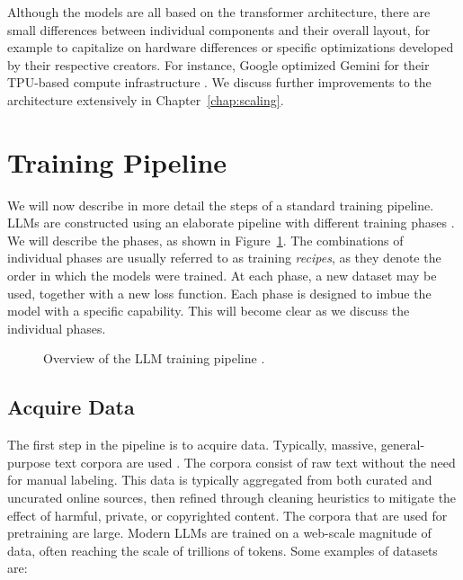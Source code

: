 Although the models are all based on the transformer architecture, there are small differences between individual components and  their overall layout, for example to capitalize on hardware differences or specific optimizations developed by their respective creators. For instance, Google optimized Gemini for their TPU-based compute infrastructure \citep{jouppi2023tpu}. We discuss further improvements to the architecture %
extensively in Chapter~\ref{chap:scaling}. 



\section{Training Pipeline}
\label{sec:pipeline-training}
We will now describe  in more detail the steps of a standard training pipeline.
LLMs are constructed using an elaborate pipeline with different training phases \citep{radford2019language,minaee2024large}. We will  describe the phases, as shown in Figure~\ref{fig:llm-training-pipeline}. The combinations of individual phases are usually referred to as training {\em recipes}, as they denote the order in which the models were trained. At each phase, a new dataset may be used, together with a new loss function. Each phase is designed to imbue the model with a specific capability. This will become clear as we discuss the individual  phases.



\begin{figure}
    \centering
    
    \caption{Overview of the LLM training pipeline \citep{radford2019language,minaee2024large}.}
    \label{fig:llm-training-pipeline}
\end{figure}

\subsection{Acquire Data}
The first step in the pipeline is to acquire data. Typically,  massive, general-purpose text corpora are used \citep{brown2020language}.  The corpora consist of raw text without the need for manual  labeling. This data is typically aggregated from both curated and uncurated online sources, then refined through cleaning heuristics to mitigate the effect of harmful, private, or copyrighted content.
%
The corpora that are used for pretraining are large. Modern LLMs are trained on a web-scale magnitude of data, often reaching the scale of trillions of tokens. Some examples of datasets are:

